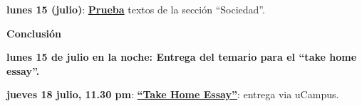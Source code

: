 \documentclass[letterpaper]{article}
\renewenvironment{itemize}{
  \begin{list}{}{
    \setlength{\leftmargin}{1.5em}
  }
}{
  \end{list}
}
\begin{document}
\begin{enumerate}
\begin{itemize}
    \vspace{0.4cm}

		\item[\Pointinghand]  {\bf lunes 15 (julio)}: {\bf \underline{Prueba}} textos de la secci\'on ``Sociedad''.

\end{itemize}

\item {\bf Conclusi\'on}

\begin{itemize}
    \item {\bf lunes 15 de julio en la noche: Entrega del temario para el ``take home essay''.}
		\item[\Pointinghand]  {\bf jueves 18 julio, 11.30 pm}: {\bf \underline{``Take Home Essay''}}: entrega via uCampus. 
\end{itemize}


\end{enumerate}





\newpage
{}
\setcounter{page}{1}
\printbibliography
\end{document}
